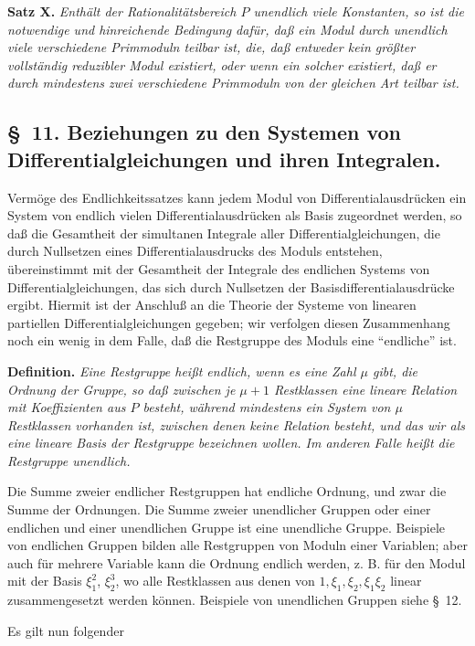 \documentclass[11pt]{article}
\begin{document}
\textbf{Satz X.} \emph{Enthält der Rationalitätsbereich $P$ unendlich viele Konstanten, so ist die notwendige und hinreichende Bedingung dafür, daß ein Modul durch unendlich viele verschiedene Primmoduln teilbar ist, die, daß entweder kein größter vollständig reduzibler Modul existiert, oder wenn ein solcher existiert, daß er durch mindestens zwei verschiedene Primmoduln von der gleichen Art teilbar ist.}

\subsection*{\S~11. Beziehungen zu den Systemen von Differentialgleichungen und ihren Integralen.}

Vermöge des Endlichkeitssatzes kann jedem Modul von Differentialausdrücken ein System von endlich vielen Differentialausdrücken als Basis zugeordnet werden, so daß die Gesamtheit der simultanen Integrale aller Differentialgleichungen, die durch Nullsetzen eines Differentialausdrucks des Moduls entstehen, übereinstimmt mit der Gesamtheit der Integrale des endlichen Systems von Differentialgleichungen, das sich durch Nullsetzen der Basisdifferentialausdrücke ergibt. Hiermit ist der Anschluß an die Theorie der Systeme von linearen partiellen Differentialgleichungen gegeben; wir verfolgen diesen Zusammenhang noch ein wenig in dem Falle, daß die Restgruppe des Moduls eine ``endliche'' ist.

\textbf{Definition.} \emph{Eine Restgruppe heißt endlich, wenn es eine Zahl $\mu$ gibt, die Ordnung der Gruppe, so daß zwischen je $\mu+1$ Restklassen eine lineare Relation mit Koeffizienten aus $P$ besteht, während mindestens ein System von $\mu$ Restklassen vorhanden ist, zwischen denen keine Relation besteht, und das wir als eine lineare Basis der Restgruppe bezeichnen wollen. Im anderen Falle heißt die Restgruppe unendlich.}

Die Summe zweier endlicher Restgruppen hat endliche Ordnung, und zwar die Summe der Ordnungen. Die Summe zweier unendlicher Gruppen oder einer endlichen und einer unendlichen Gruppe ist eine unendliche Gruppe. Beispiele von endlichen Gruppen bilden alle Restgruppen von Moduln einer Variablen; aber auch für mehrere Variable kann die Ordnung endlich werden, z. B. für den Modul mit der Basis $\xi_1^2$, $\xi_2^3$, wo alle Restklassen aus denen von $1,\xi_1,\xi_2,\xi_1\xi_2$ linear zusammengesetzt werden können. Beispiele von unendlichen Gruppen siehe \S~12.

Es gilt nun folgender
\end{document}
